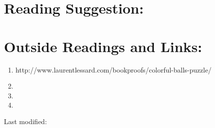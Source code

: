 \documentclass[12pt]{article}
\begin{document}
\section*{Reading Suggestion:}




\hr

\section*{Outside Readings and Links:}
\begin{enumerate}
    \item
        http://www.laurentlessard.com/bookproofs/colorful-balls-puzzle/
    \item
    \item
    \item
\end{enumerate}

\hr

\mydisclaim \myfooter

Last modified:  \flastmod
\end{document}

